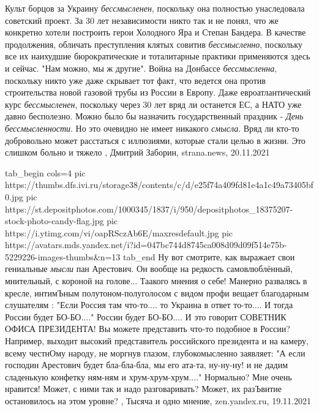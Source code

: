Культ борцов за Украину \emph{бессмысленен}, поскольку она полностью унаследовала
советский проект. За 30 лет независимости никто так и не понял, что же
конкретно хотели построить герои Холодного Яра и Степан Бандера.  В качестве
продолжения, обличать преступления клятых совитив \emph{бессмысленно}, поскольку все
их наихудшие бюрократические и тоталитарные практики применяются здесь и
сейчас. "Нам можно, мы ж другие".  Война на Донбассе \emph{бессмысленна}, поскольку
никто уже даже скрывает тот факт, что ведется она против строительства новой
газовой трубы из России в Европу.  Даже евроатлантический курс \emph{бессмысленен},
поскольку через 30 лет вряд ли останется ЕС, а НАТО уже давно бесполезно.
Можно было бы назначить государственный праздник - \emph{День бессмысленности}. Но это
очевидно не имеет никакого \emph{смысла}. Вряд ли кто-то добровольно может расстаться
с иллюзиями, которые стали целью в жизни. Это слишком больно и тяжело
, 
Дмитрий Заборин, strana.news, 20.11.2021

\ifcmt
  tab_begin cols=4
     pic https://thumbs.dfs.ivi.ru/storage38/contents/c/d/e25f74a409fd81e4a1c49a73405bf0.jpg
     pic https://st.depositphotos.com/1000345/1837/i/950/depositphotos_18375207-stock-photo-candy-flag.jpg
		 pic https://i.ytimg.com/vi/oapRSczAb6E/maxresdefault.jpg
		 pic https://avatars.mds.yandex.net/i?id=047bc744d8745ca008d09d09f514e75b-5229226-images-thumbs&n=13
  tab_end
\fi
Ну вот смотрите, как выражает свои гениальные \emph{мысли} пан Арестович.  Он
вообще на редкость самовлюблённый, мнительный, с короной на голове...  Таакого
мнения о себе!  Манерно развалясь в кресле, интимЪным полутоном-полуголосом с
видом профи вещает благодарным слушателям : "Если Россия там что-то.... то
Украина в ответ то-то.... И тогда России будет БО-БО...." России будет
БО-БО.... И это говорит СОВЕТНИК ОФИСА ПРЕЗИДЕНТА!  Вы можете представить
что-то подобное в России? Например, выходит высокий представитель российского
президента и на камеру, всему честнОму народу, не моргнув глазом,
глубокомысленно заявляет: "А если господин Арестович будет бла-бла-бла, мы его
ата-та, ну-ну-ну! и не дадим сладенькую конфетку ням-ням и хрум-хрум-хрум...."
Нормально? Мне очень нравится! Может, с ними так и надо разговаривать? Может,
их разЪвитие остановилось на этом уровне?
, 
Тысяча и одно мнение, zen.yandex.ru, 19.11.2021 

